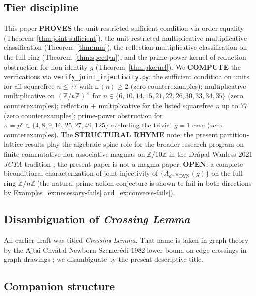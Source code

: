 \documentclass[11pt,reqno]{amsart}
\theoremstyle{plain}
\theoremstyle{definition}
\theoremstyle{remark}
\DeclareMathOperator{\dyn}{DYN}
\newcommand{\Z}{\mathbb{Z}}
\begin{document}
\subsection{Tier discipline}

This paper \textbf{PROVES} the unit-restricted sufficient condition
via order-equality (Theorem~\ref{thm:joint-sufficient}), the
unit-restricted multiplicative-multiplicative classification
(Theorem~\ref{thm:mm}), the reflection-multiplicative classification
on the full ring (Theorem~\ref{thm:specdyn}), and the prime-power
kernel-of-reduction obstruction for non-identity $g$
(Theorem~\ref{thm:pkernel}). We \textbf{COMPUTE} the verifications
via \texttt{verify\_joint\_injectivity.py}: the sufficient condition
on units for all squarefree $n \le 77$ with $\omega(n) \ge 2$ (zero
counterexamples); multiplicative-multiplicative on $(\Z/n\Z)^{\times}$
for $n \in \{6, 10, 14, 15, 21, 22, 26, 30, 33, 34, 35\}$ (zero
counterexamples); reflection $+$ multiplicative for the listed
squarefree $n$ up to $77$ (zero counterexamples); prime-power
obstruction for $n = p^{r} \in \{4, 8, 9, 16, 25, 27, 49, 125\}$
excluding the trivial $g = 1$ case (zero counterexamples). The
\textbf{STRUCTURAL RHYME} note: the present partition-lattice results
play the algebraic-spine role for the broader research program on
finite commutative non-associative magmas on $\Z/10\Z$ in the
Dr\'apal-Wanless 2021 \emph{JCTA} tradition \cite{DrapalWanless2021};
the present paper is not a magma paper. \textbf{OPEN}: a complete
biconditional characterization of joint injectivity of $\{A_{d},
\pi_{\dyn}(g)\}$ on the full ring $\Z/n\Z$ (the natural
prime-action conjecture is shown to fail in both directions by
Examples~\ref{ex:necessary-fails} and~\ref{ex:converse-fails}).

\subsection{Disambiguation of \emph{Crossing Lemma}}

An earlier draft was titled \emph{Crossing Lemma}. That name is
taken in graph theory by the Ajtai-Chv\'atal-Newborn-Szemer\'edi 1982
lower bound on edge crossings in graph drawings
\cite{ACNS1982,LeightonRichterThomassen1997}; we disambiguate by the
present descriptive title.

\subsection{Companion structure}
\end{document}
